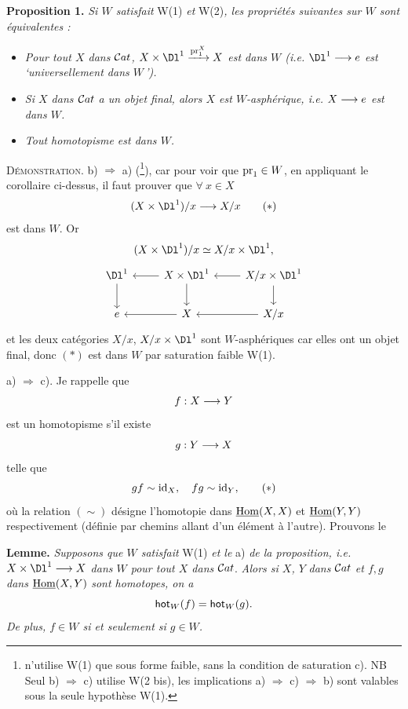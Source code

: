 \textbf{Proposition 1.} \textit{Si $W$ satisfait} W(1) \textit{et} W(2)\textit{, les propriétés suivantes sur $W$ sont équivalentes :}

\begin{itemize}[leftmargin=*]
\item[\textit{a)}] \textit{Pour tout $X$ dans $\mathcal{C}at$, $X \times \Dl^1 \xrightarrow{\pr_1^X} X$ est dans $W$ (i.e. $\Dl^1 \fl e$ est `universellement dans $W$\,').}

\item[\textit{b)}] \textit{Si $X$ dans $\mathcal{C}at$ a un objet final, alors $X$ est $W$-asphérique, i.e. $X \longrightarrow e$ est dans $W$.}

\item[\textit{c)}] \textit{Tout homotopisme est dans $W$.}
\end{itemize}

\clearpage


\textsc{Démonstration.} b) $\Longrightarrow$ a) (\footnote{n'utilise W(1) que sous forme faible, sans la condition de saturation c). NB Seul b) $\Longrightarrow$ c) utilise W(2 bis), les implications a) $\Longrightarrow$ c) $\Longrightarrow$ b) sont valables sous la seule hypothèse W(1).}), car pour voir que $\mathrm{pr}_1 \in W$, en appliquant le corollaire ci-dessus, il faut prouver que $\forall\ x \in X$
\[ (X \times \Dl^1)/x \fl X/x \tag*{$(*)$} \]
est dans $W$. Or
\[ (X \times \Dl^1)/x \simeq X/x \times \Dl^1, \]
\[
\begin{tikzcd}
\Dl^1 \arrow[d] & X \times \Dl^1 \arrow[l] \arrow[d] & X/x \times \Dl^1 \arrow[l] \arrow[d] \\
e & X \arrow[l] & X/x \arrow[l]
\end{tikzcd}
\]
 et les deux catégories $X/x$, $X/x \times \Dl^1$ sont $W$-asphériques car elles ont un objet final, donc $(*)$ est dans $W$ par saturation faible W(1).

a) $\Longrightarrow$ c). Je rappelle que
\[ f : X \longrightarrow Y \]
est un homotopisme s'il existe
\[ g : Y \longrightarrow X \]
telle que
\[ gf \sim \id_X, \quad fg \sim \id_Y, \tag*{$(*)$} \]
où la relation $(\sim)$ désigne l'homotopie dans $\underline{\operatorname{Hom}}(X,X)$ et $\underline{\operatorname{Hom}}(Y,Y)$ respectivement (définie par chemins allant d'un élément à l'autre). Prouvons le

\textbf{Lemme.} \textit{Supposons que $W$ satisfait} W(1) \textit{et le} a) \textit{de la proposition, i.e. $X \times \Dl^1 \fl X$ dans $W$ pour tout $X$ dans} $\mathcal{C}at$. \textit{Alors si $X$, $Y$} \textit{dans} $\mathcal{C}at$ \textit{et $f, g$ dans} $\underline{\operatorname{Hom}}(X,Y)$ \textit{sont homotopes, on a}
\[ \mathsf{hot}_W(f) = \mathsf{hot}_W(g). \]
\textit{De plus, $f \in W$ si et seulement si $g \in W$.}

